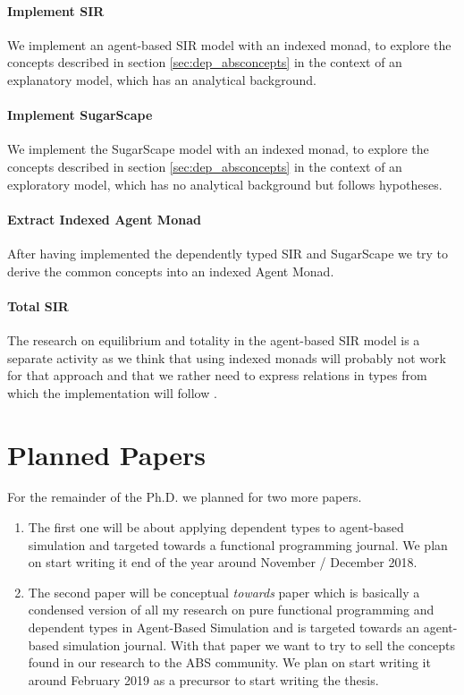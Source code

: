 \paragraph{Implement SIR}
We implement an agent-based SIR model with an indexed monad, to explore the concepts described in section \ref{sec:dep_absconcepts} in the context of an explanatory model, which has an analytical background.

\paragraph{Implement SugarScape}
We implement the SugarScape model with an indexed monad, to explore the concepts described in section \ref{sec:dep_absconcepts} in the context of an exploratory model, which has no analytical background but follows hypotheses.

\paragraph{Extract Indexed Agent Monad}
After having implemented the dependently typed SIR and SugarScape we try to derive the common concepts into an indexed Agent Monad.

\paragraph{Total SIR}
The research on equilibrium and totality in the agent-based SIR model is a separate activity as we think that using indexed monads will probably not work for that approach and that we rather need to express relations in types from which the implementation will follow  .

\section{Planned Papers}
For the remainder of the Ph.D. we planned for two more papers.

\begin{enumerate}
	\item The first one will be about applying dependent types to agent-based simulation and targeted towards a functional programming journal. We plan on start writing it end of the year around November / December 2018.
	\item The second paper will be conceptual \textit{towards} paper which is basically a condensed version of all my research on pure functional programming and dependent types in Agent-Based Simulation and is targeted towards an agent-based simulation journal. With that paper we want to try to sell the concepts found in our research to the ABS community. We plan on start writing it around February 2019 as a precursor to start writing the thesis.
\end{enumerate}

